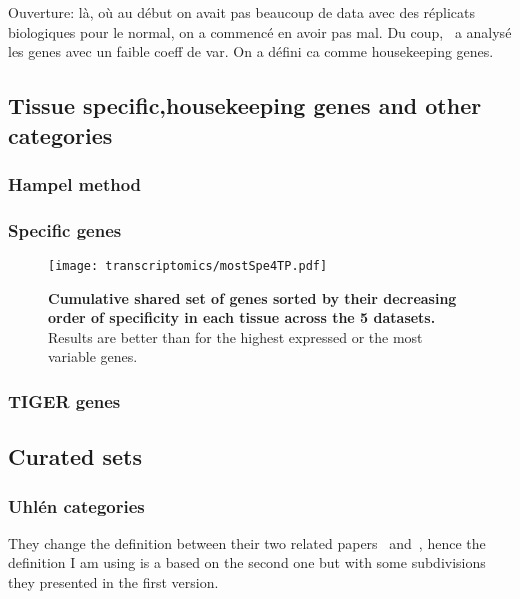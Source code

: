 
Ouverture: là, où au début on avait pas beaucoup de data avec des réplicats
biologiques pour le normal, on a commencé en avoir pas mal. Du coup, \nuno\
a analysé les genes avec un faible coeff de var. On a défini ca comme housekeeping
genes.

\subsection{Tissue specific,housekeeping genes and other categories}\label{subsec:Trans_TissueSpeAndHK}

\subsubsection{Hampel method}

\subsubsection{Specific genes}

\begin{figure}[htpb]
    \texttt{[image: transcriptomics/mostSpe4TP.pdf]}\centering
    \caption[Cumulative shared set of genes sorted by their specificity in each
    tissue across the 5 datasets]{\label{fig:mostSpe4T}\textbf{Cumulative shared
    set of genes sorted by their decreasing order of specificity in each tissue
    across the 5 datasets.} Results are better than for the highest expressed or
    the most variable genes.}
\end{figure}

\subsubsection{TIGER genes}




\subsection{Curated sets}\label{subsec:Trans_curatedSets}


\subsubsection{Uhlén categories}

They change the definition between their two related papers~
and~\mycite{Uhlen2015}, hence the definition I am using is a based on the second
one but with some subdivisions they presented in the first version.

